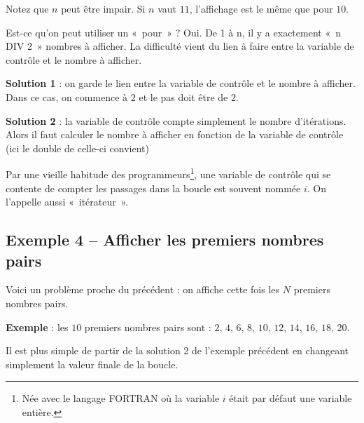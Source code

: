 		Notez que $n$ peut être impair. Si $n$ vaut $11$, 
		l'affichage est le même que pour $10$.

		Est-ce qu'on peut utiliser un «~pour~» ? 
		Oui. De 1 à n, il y a exactement «~n DIV 2~» nombres à afficher. 
		La difficulté vient du lien à faire entre la variable de
		contrôle et le nombre à afficher.

		\textbf{Solution 1} : 
		on garde le lien entre la variable de contrôle 
		et le nombre à afficher. 
		Dans ce cas, on commence à $2$ et le pas doit être de $2$.


		\textbf{Solution 2} : 
		la variable de contrôle compte simplement le nombre d'itérations.
		Alors il faut calculer le nombre à afficher en fonction de la variable
		de contrôle (ici le double de celle-ci convient)


		Par une vieille habitude des programmeurs\footnote{Née avec 
		le langage FORTRAN où la variable $i$ était par défaut une variable entière.},
		une variable de contrôle qui se contente de compter les passages dans
		la boucle est souvent nommée $i$. 
		On l'appelle aussi «~itérateur~».

	\subsection{Exemple 4 -- Afficher les premiers nombres pairs}

		Voici un problème proche du précédent : 
		on affiche cette fois les $N$ premiers nombres pairs.
		
		\textbf{Exemple} : 
		les $10$ premiers nombres pairs sont : $2$, $4$, $6$, $8$, $10$, $12$, $14$, $16$, $18$, $20$.
		
		Il est plus simple de partir de la solution 2 de l'exemple précédent
		en changeant simplement la valeur finale de la boucle.


